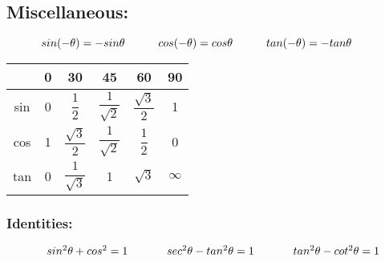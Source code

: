 \documentclass{article}
\begin{document}
\subsection{Miscellaneous:}
$
\indent\indent sin(-\theta)=-sin\theta\\
\indent\indent cos(-\theta)=cos\theta\\
\indent\indent tan(-\theta)=-tan\theta\\\\
$
\begin{tabular}{|c|ccccc|}
\hline
    & 0 & 30  &  45  &  60  &  90\\
\hline
sin & 0 & $\dfrac{1}{2}$ & $\dfrac{1}{\sqrt{2}}$ & $\dfrac{\sqrt{3}}{2}$ & 1\\
\hline
cos &1&$\dfrac{\sqrt{3}}{2}$&$\dfrac{1}{\sqrt{2}}$&$\dfrac{1}{2}$&0\\
\hline
tan & 0 & $\dfrac{1}{\sqrt{3}}$ & 1 & $\sqrt{3}$ & $\infty$\\
\hline
\end{tabular}
\subsubsection{Identities:}
$
\indent\indent \,\,\, sin^{2}\theta+cos^{2}=1\\
\indent\indent \,\,\, sec^{2}\theta-tan^{2}\theta=1\\
\indent\indent \,\,\, tan^{2}\theta-cot^{2}\theta=1
$
\end{document}
